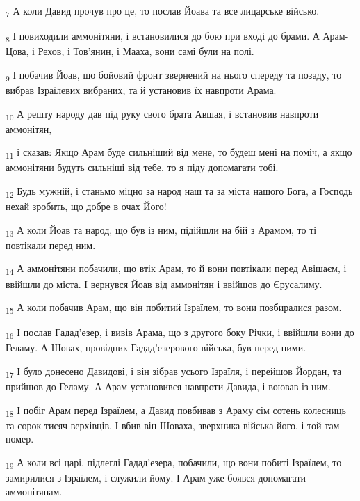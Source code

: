 \begin{tcolorbox}
\textsubscript{7} А коли Давид прочув про це, то послав Йоава та все лицарське військо.
\end{tcolorbox}
\begin{tcolorbox}
\textsubscript{8} І повиходили аммонітяни, і встановилися до бою при вході до брами. А Арам-Цова, і Рехов, і Тов'янин, і Мааха, вони самі були на полі.
\end{tcolorbox}
\begin{tcolorbox}
\textsubscript{9} І побачив Йоав, що бойовий фронт звернений на нього спереду та позаду, то вибрав Ізраїлевих вибраних, та й установив їх навпроти Арама.
\end{tcolorbox}
\begin{tcolorbox}
\textsubscript{10} А решту народу дав під руку свого брата Авшая, і встановив навпроти аммонітян,
\end{tcolorbox}
\begin{tcolorbox}
\textsubscript{11} і сказав: Якщо Арам буде сильніший від мене, то будеш мені на поміч, а якщо аммонітяни будуть сильніші від тебе, то я піду допомагати тобі.
\end{tcolorbox}
\begin{tcolorbox}
\textsubscript{12} Будь мужній, і станьмо міцно за народ наш та за міста нашого Бога, а Господь нехай зробить, що добре в очах Його!
\end{tcolorbox}
\begin{tcolorbox}
\textsubscript{13} А коли Йоав та народ, що був із ним, підійшли на бій з Арамом, то ті повтікали перед ним.
\end{tcolorbox}
\begin{tcolorbox}
\textsubscript{14} А аммонітяни побачили, що втік Арам, то й вони повтікали перед Авішаєм, і ввійшли до міста. І вернувся Йоав від аммонітян і ввійшов до Єрусалиму.
\end{tcolorbox}
\begin{tcolorbox}
\textsubscript{15} А коли побачив Арам, що він побитий Ізраїлем, то вони позбиралися разом.
\end{tcolorbox}
\begin{tcolorbox}
\textsubscript{16} І послав Гадад'езер, і вивів Арама, що з другого боку Річки, і ввійшли вони до Геламу. А Шовах, провідник Гадад'езерового війська, був перед ними.
\end{tcolorbox}
\begin{tcolorbox}
\textsubscript{17} І було донесено Давидові, і він зібрав усього Ізраїля, і перейшов Йордан, та прийшов до Геламу. А Арам установився навпроти Давида, і воював із ним.
\end{tcolorbox}
\begin{tcolorbox}
\textsubscript{18} І побіг Арам перед Ізраїлем, а Давид повбивав з Араму сім сотень колесниць та сорок тисяч верхівців. І вбив він Шоваха, зверхника війська його, і той там помер.
\end{tcolorbox}
\begin{tcolorbox}
\textsubscript{19} А коли всі царі, підлеглі Гадад'езера, побачили, що вони побиті Ізраїлем, то замирилися з Ізраїлем, і служили йому. І Арам уже боявся допомагати аммонітянам.
\end{tcolorbox}
